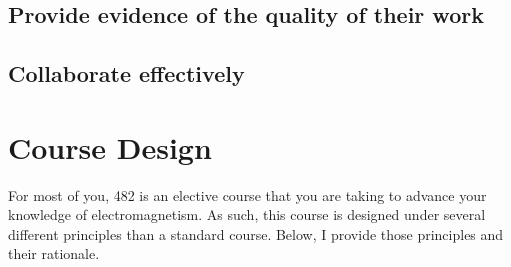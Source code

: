 \documentclass[letterpaper,10pt,english]{jupyterBook}
\begin{document}
\subsection{Provide evidence of the quality of their work}
\label{\detokenize{content/0_course/goals:provide-evidence-of-the-quality-of-their-work}}

\subsection{Collaborate effectively}
\label{\detokenize{content/0_course/goals:collaborate-effectively}}

\section{Course Design}
\label{\detokenize{content/0_course/design:course-design}}\label{\detokenize{content/0_course/design::doc}}
\sphinxAtStartPar
For most of you, 482 is an elective course that you are taking to advance your knowledge of electromagnetism. As such, this course is designed under several different principles than a standard course. Below, I provide those principles and their rationale.
\end{document}
